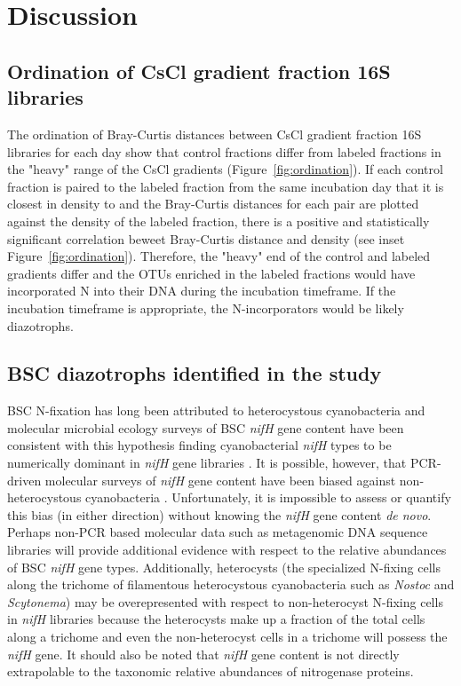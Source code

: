 \section{Discussion}

\subsection{Ordination of CsCl gradient fraction 16S libraries}
The ordination of Bray-Curtis distances between CsCl gradient fraction 16S
libraries for each day show that control fractions differ from labeled
fractions in the "heavy" range of the CsCl gradients
(Figure~\ref{fig:ordination}). If each control fraction is paired to the
labeled fraction from the same incubation day that it is closest in density to
and the Bray-Curtis distances for each pair are plotted against the density of
the labeled fraction, there is a positive and statistically significant
correlation beweet Bray-Curtis distance and density (see inset
Figure~\ref{fig:ordination}).  Therefore, the "heavy" end of the control and
labeled gradients differ and the
OTUs enriched in the labeled fractions would have incorporated N into their DNA
during the incubation timeframe. If the incubation timeframe is appropriate,
the N-incorporators would be likely diazotrophs.     

\subsection{BSC diazotrophs identified in the study}
BSC N-fixation has long been attributed to heterocystous cyanobacteria and
molecular microbial ecology surveys of BSC \textit{nifH} gene content have been
consistent with this hypothesis finding cyanobacterial \textit{nifH} types to
be numerically dominant in \textit{nifH} gene libraries
\citep{Yeager,14766579,Yeager_2012}. It is possible, however, that PCR-driven
molecular surveys of \textit{nifH} gene content have been biased against
non-heterocystous cyanobacteria \citep{Gaby_2012}. Unfortunately, it is impossible to
assess or quantify this bias (in either direction) without knowing the
\textit{nifH} gene content \textit{de novo}. Perhaps non-PCR based molecular
data such as metagenomic DNA sequence libraries will provide additional
evidence with respect to the relative abundances of BSC \textit{nifH} gene
types. Additionally, heterocysts (the specialized N-fixing cells along the
trichome of filamentous heterocystous cyanobacteria such as \textit{Nostoc} and
\textit{Scytonema}) may be overepresented with respect to non-heterocyst
N-fixing cells in \textit{nifH} libraries because the heterocysts make up a
fraction of the total cells along a trichome and even the non-heterocyst cells
in a trichome will possess the \textit{nifH} gene. It should also be noted that
\textit{nifH} gene content is not directly extrapolable to the taxonomic
relative abundances of nitrogenase proteins.

